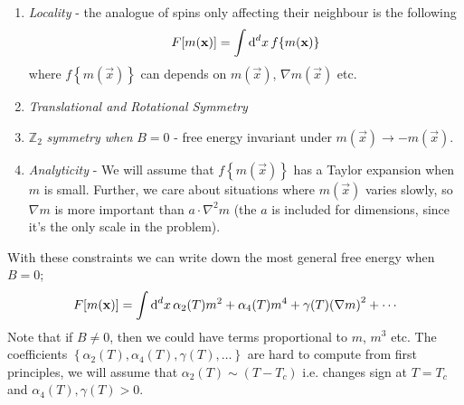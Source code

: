 \begin{enumerate}
\item \emph{Locality} - the analogue of spins only affecting their neighbour is the following
$$F[m(\vec x)] = \int{\upd{^{d}x} f\left\{m(\vec x)\right\}}$$
where $f\left\{m(\vec x)\right\}$ can depends on $m(\vec x)$, $\nabla m(\vec x)$ etc.
\item \emph{Translational and Rotational Symmetry}
\item $\mathbb{Z}_2$ \emph{symmetry when} $B = 0$ - free energy invariant under $m(\vec x) \rightarrow -m(\vec x)$.
\item \emph{Analyticity} - We will assume that $f\left\{m(\vec x)\right\}$ has a Taylor expansion when $m$ is small. Further, we care about situations where $m(\vec x)$ varies slowly, so $\nabla m$ is more important than $a \cdot \nabla^2 m$ (the $a$ is included for dimensions, since it's the only scale in the problem). 
\end{enumerate}
\begin{thm}
With these constraints we can write down the most general free energy when $B = 0$;
\begin{dmath}
\label{eq:free_energy}
F[m(\vec x)] = \int{\upd{^d x} \alpha_2 (T) m^2 + \alpha_4 (T) m^4 + \gamma(T) \left( \nabla m \right)^2 + \cdots}
\end{dmath}
Note that if $B \neq 0$, then we could have terms proportional to $m$, $m^3$ etc. The coefficients $\left\{\alpha_2(T), \alpha_4(T), \gamma(T), \ldots \right\}$ are hard to compute from first principles, we will assume that $\alpha_2(T) \sim (T - T_c)$ i.e. changes sign at $T = T_c$ and $\alpha_4(T), \gamma(T) > 0$.
\end{thm}
